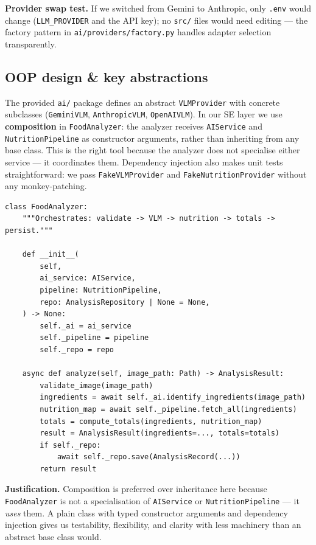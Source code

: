 \documentclass[11pt,a4paper]{article}
\begin{document}
\textbf{Provider swap test.}
If we switched from Gemini to Anthropic, only \texttt{.env} would change (\texttt{LLM\_PROVIDER} and the API key); no \texttt{src/} files would need editing --- the factory pattern in \texttt{ai/providers/factory.py} handles adapter selection transparently.

\subsection{OOP design \& key abstractions}

The provided \texttt{ai/} package defines an abstract \texttt{VLMProvider} with concrete subclasses (\texttt{GeminiVLM}, \texttt{AnthropicVLM}, \texttt{OpenAIVLM}).
In our SE layer we use \textbf{composition} in \texttt{FoodAnalyzer}: the analyzer receives \texttt{AIService} and \texttt{NutritionPipeline} as constructor arguments, rather than inheriting from any base class.
This is the right tool because the analyzer does not specialise either service --- it coordinates them.
Dependency injection also makes unit tests straightforward: we pass \texttt{FakeVLMProvider} and \texttt{FakeNutritionProvider} without any monkey-patching.

\begin{lstlisting}[style=python, caption={core/analyzer.py (simplified)}]
class FoodAnalyzer:
    """Orchestrates: validate -> VLM -> nutrition -> totals -> persist."""

    def __init__(
        self,
        ai_service: AIService,
        pipeline: NutritionPipeline,
        repo: AnalysisRepository | None = None,
    ) -> None:
        self._ai = ai_service
        self._pipeline = pipeline
        self._repo = repo

    async def analyze(self, image_path: Path) -> AnalysisResult:
        validate_image(image_path)
        ingredients = await self._ai.identify_ingredients(image_path)
        nutrition_map = await self._pipeline.fetch_all(ingredients)
        totals = compute_totals(ingredients, nutrition_map)
        result = AnalysisResult(ingredients=..., totals=totals)
        if self._repo:
            await self._repo.save(AnalysisRecord(...))
        return result
\end{lstlisting}

\textbf{Justification.}
Composition is preferred over inheritance here because \texttt{FoodAnalyzer} is not a specialisation of \texttt{AIService} or \texttt{NutritionPipeline} --- it \emph{uses} them.
A plain class with typed constructor arguments and dependency injection gives us testability, flexibility, and clarity with less machinery than an abstract base class would.
\end{document}
